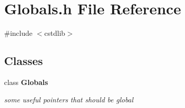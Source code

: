 \section{Globals.\+h File Reference}
\label{Globals_8h}
{\ttfamily \#include $<$cstdlib$>$}\newline
\subsection*{Classes}
\begin{DoxyCompactItemize}
\item 
class \textbf{ Globals}
\begin{DoxyCompactList}\small\item\em some useful pointers that should be global \end{DoxyCompactList}\end{DoxyCompactItemize}
